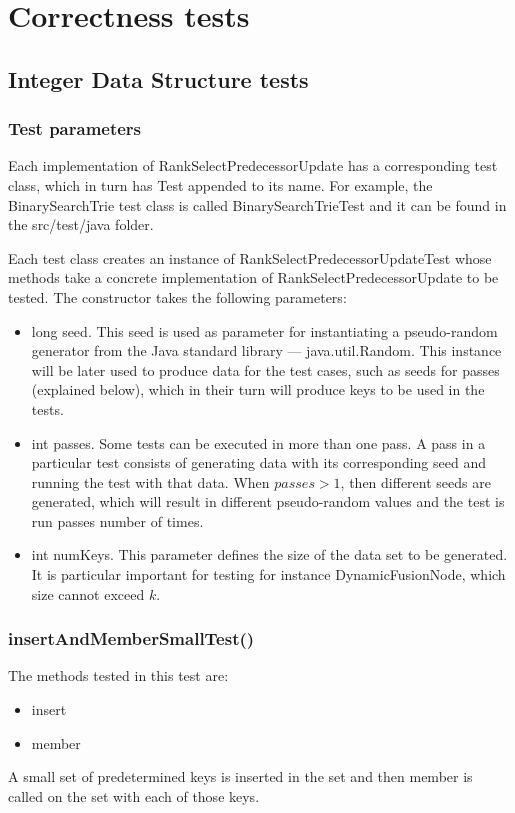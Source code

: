 \chapter{Correctness tests}

\section{Integer Data Structure tests}

\subsection{Test parameters}

Each implementation of {\ttfamily RankSelectPredecessorUpdate} has a corresponding test class, which in turn has {\ttfamily Test} appended to its name. For example, the {\ttfamily BinarySearchTrie} test class is called {\ttfamily BinarySearchTrieTest} and it can be found in the {\ttfamily src/test/java} folder.

Each test class creates an instance of {\ttfamily RankSelectPredecessorUpdateTest} whose methods take a concrete implementation of {\ttfamily RankSelectPredecessorUpdate} to be tested. The constructor takes the following parameters:

\begin{itemize}
    \item {\ttfamily long seed}. This seed is used as parameter for instantiating a pseudo-random generator from the Java standard library --- {\ttfamily java.util.Random}. This instance will be later used to produce data for the test cases, such as seeds for passes (explained below), which in their turn will produce keys to be used in the tests.
    \item {\ttfamily int passes}. Some tests can be executed in more than one pass. A pass in a particular test consists of generating data with its corresponding seed and running the test with that data. When $passes > 1$, then different seeds are generated, which will result in different pseudo-random values and the test is run {\ttfamily passes} number of times.
    \item {\ttfamily int numKeys}. This parameter defines the size of the data set to be generated. It is particular important for testing for instance {\ttfamily DynamicFusionNode}, which size cannot exceed $k$.
\end{itemize}

\subsection{{\ttfamily insertAndMemberSmallTest()}}
The methods tested in this test are:
\begin{itemize}
    \item
    {\ttfamily insert}
    \item
    {\ttfamily member}
\end{itemize}
A small set of predetermined keys is inserted in the set and then {\ttfamily member} is called on the set with each of those keys. 


